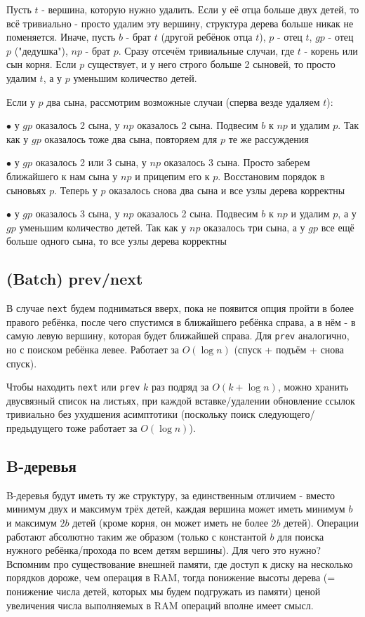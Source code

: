 Пусть $t$ - вершина, которую нужно удалить. Если у её отца больше двух детей, то всё тривиально - просто удалим эту вершину, структура дерева больше никак не поменяется. Иначе, пусть $b$ - брат $t$ (другой ребёнок отца $t$), $p$ - отец $t$, $gp$ - отец $p$ ("дедушка"), $np$ - брат $p$. Сразу отсечём тривиальные случаи, где $t$ - корень или сын корня. Если $p$ существует, и у него строго больше 2 сыновей, то просто удалим $t$, а у $p$ уменьшим количество детей.

Если у $p$ два сына, рассмотрим возможные случаи (сперва везде удаляем $t$):

$\bullet$ у $gp$ оказалось 2 сына, у $np$ оказалось 2 сына. Подвесим $b$ к $np$ и удалим $p$. Так как у $gp$ оказалось тоже два сына, повторяем для $p$ те же рассуждения

$\bullet$ у $gp$ оказалось 2 или 3 сына, у $np$ оказалось 3 сына. Просто заберем ближайшего к нам сына у $np$ и прицепим его к $p$. Восстановим порядок в сыновьях $p$. Теперь у $p$ оказалось снова два сына и все узлы дерева корректны

$\bullet$ у $gp$ оказалось 3 сына, у $np$ оказалось 2 сына. Подвесим $b$ к $np$ и удалим $p$, а у $gp$ уменьшим количество детей. Так как у $np$ оказалось три сына, а у $gp$ все ещё больше одного сына, то все узлы дерева корректны

\subsection{(Batch) prev/next}

В случае \texttt{next} будем подниматься вверх, пока не появится опция пройти в более правого ребёнка, после чего спустимся в ближайшего ребёнка справа, а в нём - в самую левую вершину, которая будет ближайшей справа. Для \texttt{prev} аналогично, но с поиском ребёнка левее. Работает за $O(\log n)$ (спуск + подъём + снова спуск).

Чтобы находить \texttt{next} или \texttt{prev} $k$ раз подряд за $O(k + \log n)$, можно хранить двусвязный список на листьях, при каждой вставке/удалении обновление ссылок тривиально без ухудшения асимптотики (поскольку поиск следующего/предыдущего тоже работает за $O(\log n)$).

\subsection{B-деревья}

B-деревья будут иметь ту же структуру, за единственным отличием - вместо минимум двух и максимум трёх детей, каждая вершина может иметь минимум $b$ и максимум $2b$ детей (кроме корня, он может иметь не более $2b$ детей). Операции работают абсолютно таким же образом (только с константой $b$ для поиска нужного ребёнка/прохода по всем детям вершины). Для чего это нужно? Вспомним про существование внешней памяти, где доступ к диску на несколько порядков дороже, чем операция в RAM, тогда понижение высоты дерева (= понижение числа детей, которых мы будем подгружать из памяти) ценой увеличения числа выполняемых в RAM операций вполне имеет смысл.
